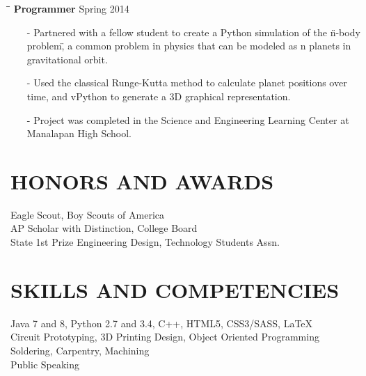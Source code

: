 \documentclass{res}
\begin{document}
\begin{resume}
  \begin{tabbing}
    \hspace{2.3in}\= \hspace{2.4in}\= \kill
    {\bf Programmer}  \>Spring 2014\\
  \end{tabbing}\vspace{-15pt}
  \begin{itemize}[leftmargin=*, nolistsep]
    \item[-] Partnered with a fellow student to create a Python simulation of the \"n-body problem\", a common problem in physics that can be modeled as n planets in gravitational orbit.
    \item[-] Used the classical Runge-Kutta method to calculate planet positions over time, and vPython to generate a 3D graphical representation.
    \item[-] Project was completed in the Science and Engineering Learning Center at Manalapan High School.
  \end{itemize}
 
\section{HONORS AND AWARDS}
	Eagle Scout, Boy Scouts of America \\
	AP Scholar with Distinction, College Board \\
	State 1st Prize Engineering Design, Technology Students Assn.

\section{SKILLS AND COMPETENCIES}
  Java 7 and 8, Python 2.7 and 3.4, C++, HTML5, CSS3/SASS, \LaTeX \\
  Circuit Prototyping, 3D Printing Design, Object Oriented Programming \\
  Soldering, Carpentry, Machining \\
  Public Speaking
	
\end{resume}
\end{document}
